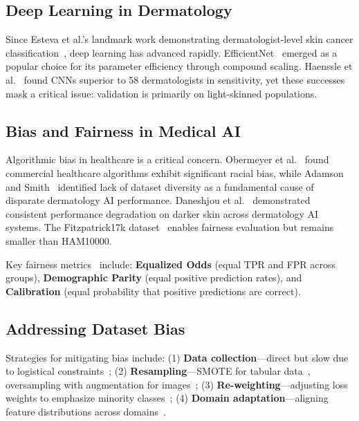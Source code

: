 \documentclass[ai,article,submit,pdftex,moreauthors]{Definitions/mdpi}
\begin{document}
\subsection{Deep Learning in Dermatology}

Since Esteva et al.'s landmark work demonstrating dermatologist-level skin cancer classification~\cite{esteva2017}, deep learning has advanced rapidly. EfficientNet~\cite{tan2019} emerged as a popular choice for its parameter efficiency through compound scaling. Haenssle et al.~\cite{haenssle2018} found CNNs superior to 58 dermatologists in sensitivity, yet these successes mask a critical issue: validation is primarily on light-skinned populations.

\subsection{Bias and Fairness in Medical AI}

Algorithmic bias in healthcare is a critical concern. Obermeyer et al.~\cite{obermeyer2019} found commercial healthcare algorithms exhibit significant racial bias, while Adamson and Smith~\cite{adamson2018} identified lack of dataset diversity as a fundamental cause of disparate dermatology AI performance. Daneshjou et al.~\cite{daneshjou2022} demonstrated consistent performance degradation on darker skin across dermatology AI systems. The Fitzpatrick17k dataset~\cite{groh2021} enables fairness evaluation but remains smaller than HAM10000.

Key fairness metrics~\cite{hardt2016} include: \textbf{Equalized Odds} (equal TPR and FPR across groups), \textbf{Demographic Parity} (equal positive prediction rates), and \textbf{Calibration} (equal probability that positive predictions are correct).

\subsection{Addressing Dataset Bias}

Strategies for mitigating bias include: (1) \textbf{Data collection}---direct but slow due to logistical constraints~\cite{codella2018}; (2) \textbf{Resampling}---SMOTE for tabular data~\cite{chawla2002}, oversampling with augmentation for images~\cite{wong2016}; (3) \textbf{Re-weighting}---adjusting loss weights to emphasize minority classes~\cite{cui2019}; (4) \textbf{Domain adaptation}---aligning feature distributions across domains~\cite{ganin2016}.
\end{document}
